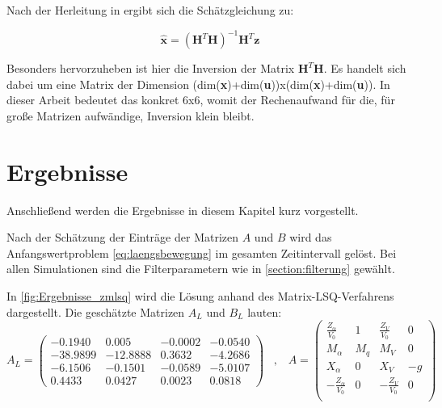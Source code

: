 Nach der Herleitung in \cite{Mandry2021} ergibt sich die Schätzgleichung zu:

\begin{equation*}
    \hat{\textbf{x}} = (\textbf{H}^T \textbf{H})^{-1}\textbf{H}^T\textbf{z}
\end{equation*}

Besonders hervorzuheben ist hier die Inversion der Matrix $\textbf{H}^T \textbf{H}$. Es handelt sich dabei um eine Matrix der Dimension (dim(\textbf{x})+dim(\textbf{u}))x(dim(\textbf{x})+dim(\textbf{u})). In dieser Arbeit bedeutet das konkret 6x6, womit der Rechenaufwand für die, für große Matrizen aufwändige, Inversion klein bleibt.
 
\section{Ergebnisse}
 
Anschließend werden die Ergebnisse in diesem Kapitel kurz vorgestellt.

Nach der Schätzung der Einträge der Matrizen $A$ und $B$ wird das Anfangswertproblem \eqref{eq:laengsbewegung} im gesamten 
Zeitintervall gelöst. Bei allen Simulationen sind die Filterparametern wie in \ref{section:filterung} gewählt.

In \cref{fig:Ergebnisse_zmlsq} wird die Lösung anhand des Matrix-LSQ-Verfahrens dargestellt. Die geschätzte Matrizen $A_L$ und $B_L$ lauten: 
\begin{equation}
 	A_L = \begin{pmatrix}
 		-0.1940 & 0.005 & -0.0002 & -0.0540 \\
 		-38.9899 & -12.8888 & 0.3632 & -4.2686 \\
 		-6.1506 & -0.1501 & -0.0589 & -5.0107 \\
 		0.4433 & 0.0427 & 0.0023 & 0.0818
 	\end{pmatrix} \;\;\; , \;\;\;
 	A = \begin{pmatrix}
		\frac{Z_\alpha}{V_0} & 1 & \frac{Z_V}{V_0} & 0\\
		M_\alpha & M_q & M_V & 0\\
		X_\alpha & 0 & X_V & -g\\
		-\frac{Z_\alpha}{V_0} & 0 & -\frac{Z_V}{V_0} & 0\\
	\end{pmatrix}
	\nonumber
\end{equation}

